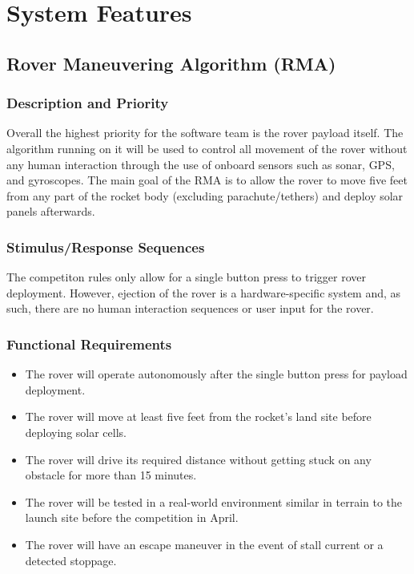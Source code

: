 \documentclass[onecolumn, draftclsnofoot, 10pt, compsoc]{IEEEtran}
\begin{document}
\section{System Features}


\subsection{Rover Maneuvering Algorithm (RMA)}
\subsubsection{Description and Priority}
Overall the highest priority for the software team is the rover payload itself.
The algorithm running on it will be used to control all movement of the rover without any human interaction through the use of onboard sensors such as sonar, GPS, and gyroscopes.
The main goal of the RMA is to allow the rover to move five feet from any part of the rocket body (excluding parachute/tethers) and deploy solar panels afterwards.

\subsubsection{Stimulus/Response Sequences}
The competiton rules only allow for a single button press to trigger rover deployment. However, ejection of the rover is a hardware-specific system and, as such, there are no human interaction sequences or user input for the rover.

\subsubsection{Functional Requirements}
\begin{itemize}
\item The rover will operate autonomously after the single button press for payload deployment.
\item The rover will move at least five feet from the rocket's land site before deploying solar cells.
\item The rover will drive its required distance without getting stuck on any obstacle for more than 15 minutes.
\item The rover will be tested in a real-world environment similar in terrain to the launch site before the competition in April.
\item The rover will have an escape maneuver in the event of stall current or a detected stoppage.
\end{itemize}
\end{document}
